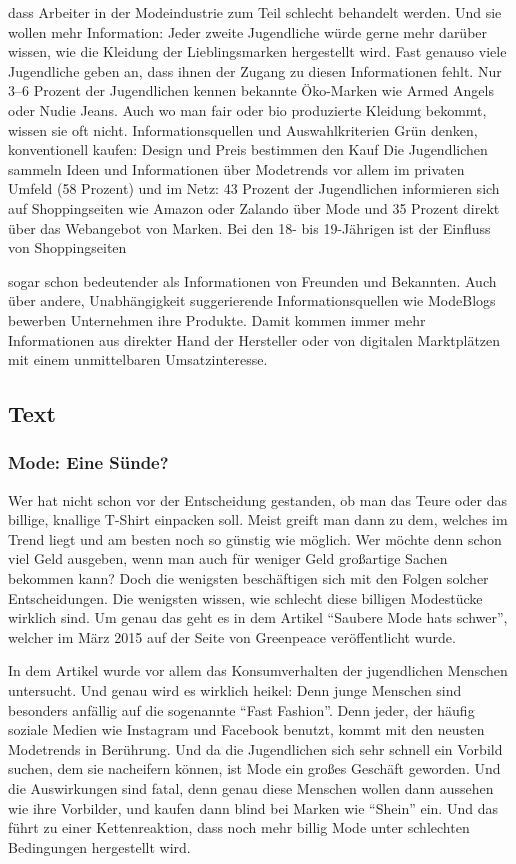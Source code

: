 dass Arbeiter in der Modeindustrie zum Teil schlecht behandelt werden. Und sie wollen
mehr Information: Jeder zweite
Jugendliche würde gerne mehr
darüber wissen, wie die Kleidung der Lieblingsmarken hergestellt wird. Fast genauso viele
Jugendliche geben an, dass ihnen
der Zugang zu diesen Informationen fehlt. Nur 3–6 Prozent der
Jugendlichen kennen bekannte
Öko-Marken wie Armed Angels
oder Nudie Jeans. Auch wo man
fair oder bio produzierte Kleidung
bekommt, wissen sie oft nicht.
Informationsquellen und
Auswahlkriterien
Grün denken, konventionell kaufen: Design und Preis bestimmen
den Kauf
Die Jugendlichen sammeln
Ideen und Informationen über
Modetrends vor allem im privaten Umfeld (58 Prozent) und im
Netz: 43 Prozent der Jugendlichen
informieren sich auf Shoppingseiten wie Amazon oder Zalando
über Mode und 35 Prozent direkt
über das Webangebot von Marken. Bei den 18- bis 19-Jährigen ist
der Einfluss von Shoppingseiten

sogar schon bedeutender als
Informationen von Freunden und
Bekannten. Auch über andere,
Unabhängigkeit suggerierende
Informationsquellen wie ModeBlogs bewerben Unternehmen
ihre Produkte. Damit kommen
immer mehr Informationen aus
direkter Hand der Hersteller oder
von digitalen Marktplätzen mit
einem unmittelbaren Umsatzinteresse.


\subsection{Text}
\subsubsection{Mode: Eine Sünde?}
Wer hat nicht schon vor der Entscheidung gestanden, ob man das Teure oder das billige, knallige T-Shirt einpacken soll. Meist greift man dann zu dem, welches im Trend liegt und am besten noch so günstig wie möglich. Wer möchte denn schon viel Geld ausgeben, wenn man auch für weniger Geld großartige Sachen bekommen kann? Doch die wenigsten beschäftigen sich mit den Folgen solcher Entscheidungen. Die wenigsten wissen, wie schlecht diese billigen Modestücke wirklich sind. Um genau das geht es in dem Artikel “Saubere Mode hats schwer”, welcher im März 2015 auf der Seite von Greenpeace veröffentlicht wurde. 

 

In dem Artikel wurde vor allem das Konsumverhalten der jugendlichen Menschen untersucht. Und genau wird es wirklich heikel: Denn junge Menschen sind besonders anfällig auf die sogenannte “Fast Fashion”. Denn jeder, der häufig soziale Medien wie Instagram und Facebook benutzt, kommt mit den neusten Modetrends in Berührung. Und da die Jugendlichen sich sehr schnell ein Vorbild suchen, dem sie nacheifern können, ist Mode ein großes Geschäft geworden. Und die Auswirkungen sind fatal, denn genau diese Menschen wollen dann aussehen wie ihre Vorbilder, und kaufen dann blind bei Marken wie “Shein” ein. Und das führt zu einer Kettenreaktion, dass noch mehr billig Mode unter schlechten Bedingungen hergestellt wird. 

